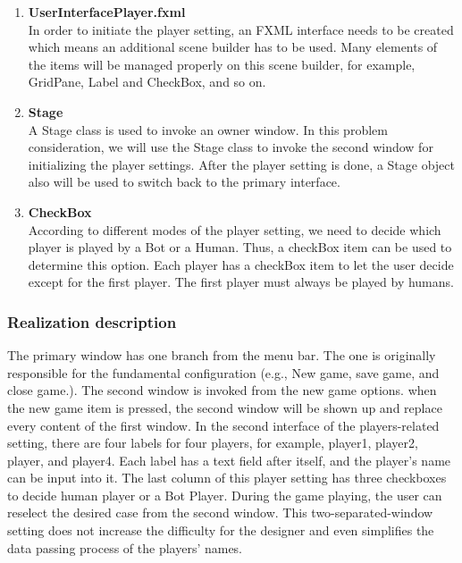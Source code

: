 \begin{enumerate}
	\item\textbf{UserInterfacePlayer.fxml}\\
    In order to initiate the player setting, an FXML interface needs to be created which means an additional scene builder has to be used. Many elements of the items will be managed properly on this scene builder, for example, GridPane, Label and CheckBox, and so on.  
	
	\item\textbf{Stage}\\
    A Stage class is used to invoke an owner window. In this problem consideration, we will use the Stage class to invoke the second window for initializing the player settings. After the player setting is done, a Stage object also will be used to switch back to the primary interface. 
	
	\item\textbf{CheckBox}\\
    According to different modes of the player setting, we need to decide which player is played by a Bot or a Human. Thus, a checkBox item can be used to determine this option. Each player has a checkBox item to let the user decide except for the first player. The first player must always be played by humans. 

	
\end{enumerate}

\subsubsection{Realization description}

The primary window has one branch from the menu bar. The one is originally responsible for the fundamental configuration (e.g., New game, save game, and close game.). The second window is invoked from the new game options. when the new game item is pressed, the second window will be shown up and replace every content of the first window. In the second interface of the players-related setting, there are four labels for four players, for example, player1, player2, player, and player4. Each label has a text field after itself, and the player's name can be input into it. The last column of this player setting has three checkboxes to decide human player or a Bot Player. During the game playing, the user can reselect the desired case from the second window. This two-separated-window setting does not increase the difficulty for the designer and even simplifies the data passing process of the players' names. 